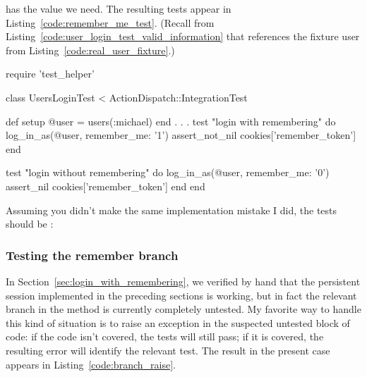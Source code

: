 \noindent has the value we need. The resulting tests appear in Listing~\ref{code:remember_me_test}. (Recall from Listing~\ref{code:user_login_test_valid_information} that  references the fixture user from Listing~\ref{code:real_user_fixture}.)

\begin{codelisting}
\label{code:remember_me_test}
\begin{code}
require 'test_helper'

class UsersLoginTest < ActionDispatch::IntegrationTest

  def setup
    @user = users(:michael)
  end
  .
  .
  .
  test "login with remembering" do
    log_in_as(@user, remember_me: '1')
    assert_not_nil cookies['remember_token']
  end

  test "login without remembering" do
    log_in_as(@user, remember_me: '0')
    assert_nil cookies['remember_token']
  end
end
\end{code}
\end{codelisting}

\noindent Assuming you didn't make the same implementation mistake I did, the tests should be \passing:

\begin{codelisting}
\codecaption{\passing}
\end{codelisting}


\subsubsection{Testing the remember branch} %
\label{sec:testing_the_remember_branch}

In Section~\ref{sec:login_with_remembering}, we verified by hand that the persistent session implemented in the preceding sections is working, but in fact the relevant branch in the  method is currently completely untested. My favorite way to handle this kind of situation is to raise an exception in the suspected untested block of code: if the code isn't covered, the tests will still pass; if it is covered, the resulting error will identify the relevant test. The result in the present case appears in Listing~\ref{code:branch_raise}.

